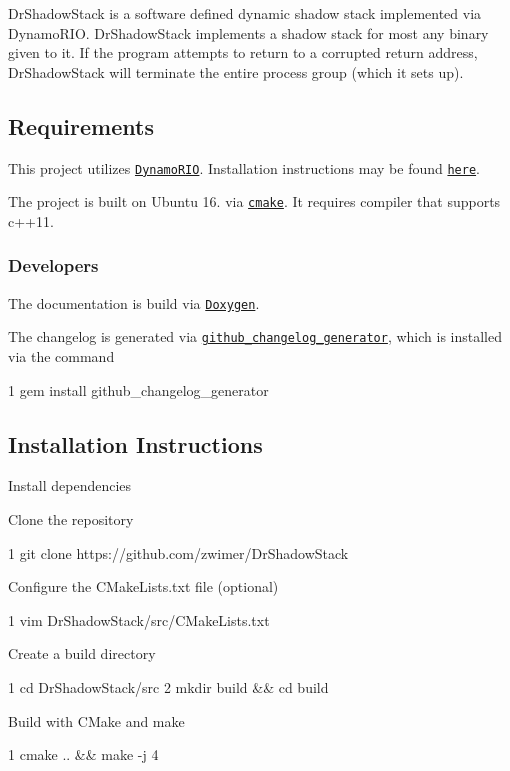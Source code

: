 Dr\+Shadow\+Stack is a software defined dynamic shadow stack implemented via Dynamo\+R\+IO. Dr\+Shadow\+Stack implements a shadow stack for most any binary given to it. If the program attempts to return to a corrupted return address, Dr\+Shadow\+Stack will terminate the entire process group (which it sets up).

\subsection*{Requirements}

This project utilizes \href{https://github.com/DynamoRIO/dynamorio}{\tt Dynamo\+R\+IO}. Installation instructions may be found \href{https://github.com/DynamoRIO/dynamorio/wiki/How-To-Build}{\tt here}.

The project is built on Ubuntu 16. via \href{https://cmake.org/}{\tt cmake}. It requires compiler that supports {\ttfamily c++11}.

\subsubsection*{Developers}

The documentation is build via \href{http://www.stack.nl/~dimitri/doxygen/}{\tt Doxygen}.

The changelog is generated via \href{https://github.com/skywinder/github-changelog-generator}{\tt github\+\_\+changelog\+\_\+generator}, which is installed via the command 
\begin{DoxyCode}
1 gem install github\_changelog\_generator
\end{DoxyCode}


\subsection*{Installation Instructions}


\begin{DoxyEnumerate}
\item Install dependencies
\item Clone the repository 
\begin{DoxyCode}
1 git clone https://github.com/zwimer/DrShadowStack
\end{DoxyCode}

\item Configure the C\+Make\+Lists.\+txt file (optional) 
\begin{DoxyCode}
1 vim DrShadowStack/src/CMakeLists.txt
\end{DoxyCode}

\item Create a build directory 
\begin{DoxyCode}
1 cd DrShadowStack/src
2 mkdir build && cd build
\end{DoxyCode}

\item Build with C\+Make and make 
\begin{DoxyCode}
1 cmake .. && make -j 4
\end{DoxyCode}

\end{DoxyEnumerate}

